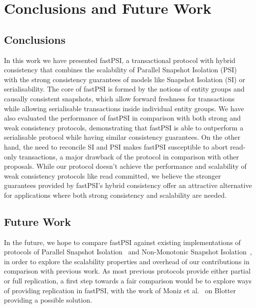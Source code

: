 \cleardoublepage
\chapter{Conclusions and Future Work}
\label{chapter:conclusion}

\section{Conclusions}

In this work we have presented fastPSI, a transactional protocol with hybrid consistency that combines the scalability of Parallel Snapshot Isolation (PSI) with the strong consistency guarantees of models like Snapshot Isolation (SI) or serialisability. The core of fastPSI is formed by the notions of entity groups and causally consistent snapshots, which allow forward freshness for transactions while allowing serialisable transactions inside individual entity groups. We have also evaluated the performance of fastPSI in comparison with both strong and weak consistency protocols, demonstrating that fastPSI is able to outperform a serialisable protocol while having similar consistency guarantees. On the other hand, the need to reconcile SI and PSI makes fastPSI susceptible to abort read-only transactions, a major drawback of the protocol in comparison with other proposals. While our protocol doesn't achieve the performance and scalability of weak consistency protocols like read committed, we believe the stronger guarantees provided by fastPSI's hybrid consistency offer an attractive alternative for applications where both strong consistency and scalability are needed.

\section{Future Work}

In the future, we hope to compare fastPSI against existing implementations of protocols of Parallel Snapshot Isolation~\citep{psi-intro} and Non-Monotonic Snapshot Isolation~\citep{ardekani_nmsi, moniz_blotter}, in order to explore the scalability properties and overhead of our contributions in comparison with previous work. As most previous protocols provide either partial or full replication, a first step towards a fair comparison would be to explore ways of providing replication in fastPSI, with the work of Moniz et al.~\citep{moniz_blotter} on Blotter providing a possible solution.


